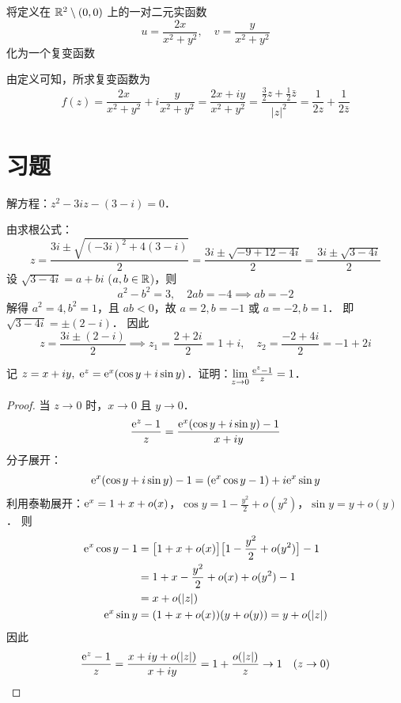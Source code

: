 \documentclass[12pt, a4paper, oneside, UTF8]{ctexbook}
\begin{document}
\begin{example}
    将定义在 $\mathbb{R}^2\setminus (0,0)$ 上的一对二元实函数
    \[ u=\frac{2x}{x^2+y^2},\quad v=\frac{y}{x^2+y^2} \]
    化为一个复变函数
\end{example}
\begin{solution}
    由定义可知，所求复变函数为
    \[ f(z) = \frac{2x}{x^2+y^2} + i\frac{y}{x^2+y^2} = \frac{2x + iy}{x^2+y^2} = \frac{\frac32z+\frac12\bar{z}}{|z|^2} = \frac{1}{2z}+\frac{1}{2\bar{z}}\]
\end{solution}

\section{习题}

\begin{exercise}
    解方程：$z^2-3iz-(3-i)=0$．
\end{exercise}
\begin{solution}
    由求根公式：
    \[
    z = \frac{3i \pm \sqrt{(-3i)^2 + 4(3-i)}}{2}
      = \frac{3i \pm \sqrt{-9 + 12 - 4i}}{2}
      = \frac{3i \pm \sqrt{3 - 4i}}{2}
    \]
    设 $\sqrt{3 - 4i} = a + bi$ ($a,b \in \mathbb{R}$)，则
    \[
    a^2 - b^2 = 3, \quad 2ab = -4 \implies ab = -2
    \]
    解得 $a^2 = 4, b^2 = 1$，且 $ab < 0$，故 $a=2, b=-1$ 或 $a=-2, b=1$．
    即 $\sqrt{3-4i} = \pm(2-i)$．
    因此
    \[
    z = \frac{3i \pm (2-i)}{2} \implies z_1 = \frac{2+2i}{2} = 1+i,\quad z_2 = \frac{-2+4i}{2} = -1+2i
    \]
\end{solution}

\begin{exercise}
    记 $z = x + iy,\;\mathrm{e}^z=\mathrm{e}^x(\cos y + i\sin y)$．证明：$\lim\limits_{z\to 0}\frac{\mathrm{e}^z-1}{z}=1$．
\end{exercise}
\begin{proof}
    当 $z \to 0$ 时，$x \to 0$ 且 $y \to 0$．
    \[
    \frac{\mathrm{e}^z - 1}{z} = \frac{\mathrm{e}^x(\cos y + i\sin y) - 1}{x + iy}
    \]
    分子展开：
    \[
    \mathrm{e}^x(\cos y + i\sin y) - 1 = (\mathrm{e}^x\cos y - 1) + i\mathrm{e}^x\sin y
    \]
    利用泰勒展开：$\mathrm{e}^x = 1 + x + o(x)$，$\cos y = 1 - \frac{y^2}{2} + o(y^2)$，$\sin y = y + o(y)$．
    则
    \begin{align*}
    \mathrm{e}^x\cos y - 1 &= \bigl[1 + x + o(x)\bigr]\bigl[1 - \frac{y^2}{2} + o(y^2)\bigr] - 1 \\
                   &= 1 + x - \frac{y^2}{2} + o(x) + o(y^2) - 1 \\
                   &= x + o(|z|) \\
    \mathrm{e}^x\sin y &= (1 + x + o(x))(y + o(y)) = y + o(|z|)
    \end{align*}
    因此
    \[
    \frac{\mathrm{e}^z - 1}{z} = \frac{x + iy + o(|z|)}{x + iy} = 1 + \frac{o(|z|)}{z} \to 1 \quad (z \to 0)
    \]
\end{proof}

\ifx\allfiles\undefined
\end{document}
